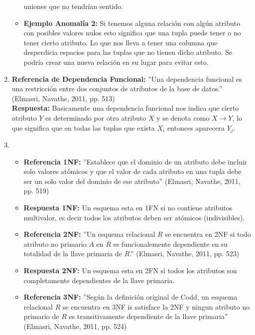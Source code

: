 \documentclass[twoside]{article}
\begin{document}
\begin{enumerate}
\begin{itemize}
                        uniones que no tendr\'ian sentido.
                  \item \textbf{Ejemplo Anomal\'ia 2:} Si tenemos alguna relaci\'on con alg\'un atributo con posibles valores nulos esto significa que una tupla puede tener o no tener cierto atributo.
                        Lo que nos lleva a tener una columna que desperdicia espacios para las tuplas que no tienen dicho atributo. Se podr\'ia crear una nueva relaci\'on en su lugar para evitar esto.
            \end{itemize}
      \item \textbf{Referencia de Dependencia Funcional:} ''Una dependencia funcional es una restricci\'on entre dos conjuntos de atributos de la base de datos.'' (Elmasri, Navathe, 2011, pp. 513)\\
            \textbf{Respuesta:} Basicamente una dependencia funcional nos indica que cierto atributo $Y$ es determinado por otro atributo $X$ y se denota como $X \rightarrow Y$,
            lo que significa que en todas las tuplas que exista $X_i$ entonces aparecera $Y_j$.
      \item
            \begin{itemize}
                  \item \textbf{Referencia 1NF:} ''Establece que el dominio de un atributo debe incluir solo valores at\'omicos y que el valor de cada atributo en una tupla
                        debe ser un solo valor del dominio de ese atributo'' (Elmasri, Navathe, 2011, pp. 519)
                  \item \textbf{Respuesta 1NF:} Un esquema esta en 1FN si no contiene atributos multivalor, es decir todos los atributos deben ser atómicos (indivisibles).
                  \item \textbf{Referencia 2NF:} ''Un esquema relacional $R$ se encuentra en 2NF si todo atributo no primario $A$ en $R$ es funcionalemente dependiente en su totalidad de la
                        llave primaria de $R$.'' (Elmasri, Navathe, 2011, pp. 523)
                  \item \textbf{Respuesta 2NF:}  Un esquema esta en 2FN si todos los atributos son completamente dependientes de la llave primaria.
                  \item \textbf{Referencia 3NF:} ''Seg\'un la definici\'on original de Codd, un esquema relacional $R$ se encuentra en 3NF is satisface la 2NF y ningun atributo no primario de $R$
                        es transitivamente dependiente de la llave primaria'' (Elmasri, Navathe, 2011, pp. 524)

\end{itemize}
\end{enumerate}
\end{document}
